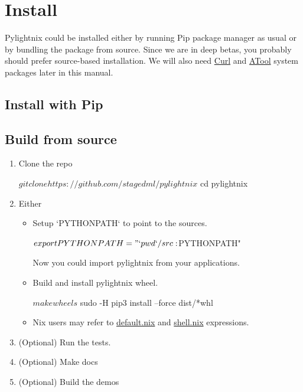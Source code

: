 \documentclass{article}
\begin{document}
\section{Install}

Pylightnix could be installed either by running Pip package manager as usual or
by bundling the package from source. Since we are in deep betas, you probably
should prefer source-based installation. We will also need
\href{https://curl.se/}{Curl} and \href{https://www.nongnu.org/atool/}{ATool}
system packages later in this manual.

\subsection{Install with Pip}


\subsection{Build from source}

\begin{enumerate}
\item Clone the repo
  \begin{shellcode}
  $ git clone https://github.com/stagedml/pylightnix
  $ cd pylightnix
  \end{shellcode}
\item Either
  \begin{itemize}
    \item Setup `PYTHONPATH` to point to the sources.
      \begin{shellcode}
      $ export PYTHONPATH="`pwd`/src:$PYTHONPATH"
      \end{shellcode}
      Now you could import pylightnix from your applications.
    \item Build and install pylightnix wheel.
      \begin{shellcode}
      $ make wheels
      $ sudo -H pip3 install --force dist/*whl
      \end{shellcode}
    \item Nix users may refer to \href{../default.nix}{default.nix} and
      \href{../shell.nix}{shell.nix} expressions.
  \end{itemize}
\item (Optional) Run the tests.
\item (Optional) Make docs
\item (Optional) Build the demos
\end{enumerate}
\end{document}
